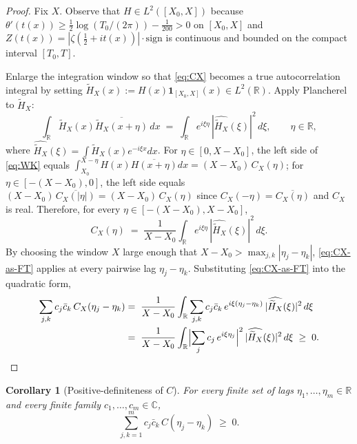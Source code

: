 \documentclass[11pt]{article}
\newtheorem{corollary}[theorem]{Corollary}
\theoremstyle{definition}
\theoremstyle{remark}
\begin{document}
\begin{proof}
Fix $X$. Observe that $H\in L^2([X_0,X])$ because $\theta'(t(x))\ge\tfrac12\log(T_0/(2\pi))-\tfrac{1}{200}>0$ on $[X_0,X]$ and $Z(t(x))=|\zeta(\tfrac12+it(x))|\cdot\mathrm{sign}$ is continuous and bounded on the compact interval $[T_0,T]$.

Enlarge the integration window so that \eqref{eq:CX} becomes a true autocorrelation integral by setting $\widetilde H_X(x):=H(x)\mathbf{1}_{[X_0,X]}(x)\in L^2(\mathbb{R})$. Apply Plancherel to $\widetilde H_X$:
\begin{equation}\label{eq:WK}
  \int_{\mathbb{R}}\widetilde H_X(x)\overline{\widetilde H_X(x+\eta)}\,dx
  \;=\;\int_{\mathbb{R}}e^{i\xi\eta}\,|\widehat{\widetilde H_X}(\xi)|^2\,d\xi,\qquad\eta\in\mathbb{R},
\end{equation}
where $\widehat{\widetilde H_X}(\xi)=\int\widetilde H_X(x)e^{-i\xi x}dx$. For $\eta\in[0,X-X_0]$, the left side of \eqref{eq:WK} equals $\int_{X_0}^{X-\eta}H(x)\overline{H(x+\eta)}dx=(X-X_0)\,C_X(\eta)$; for $\eta\in[-(X-X_0),0]$, the left side equals $(X-X_0)\,\overline{C_X(|\eta|)}=(X-X_0)\,C_X(\eta)$ since $C_X(-\eta)=\overline{C_X(\eta)}$ and $C_X$ is real. Therefore, for every $\eta\in[-(X-X_0),X-X_0]$,
\begin{equation}\label{eq:CX-as-FT}
  C_X(\eta)\;=\;\frac{1}{X-X_0}\int_{\mathbb{R}}e^{i\xi\eta}\,|\widehat{\widetilde H_X}(\xi)|^2\,d\xi.
\end{equation}
By choosing the window $X$ large enough that $X-X_0>\max_{j,k}|\eta_j-\eta_k|$, \eqref{eq:CX-as-FT} applies at every pairwise lag $\eta_j-\eta_k$. Substituting \eqref{eq:CX-as-FT} into the quadratic form,
\begin{align*}
  \sum_{j,k}c_j\bar c_k\,C_X(\eta_j-\eta_k)
  &=\;\frac{1}{X-X_0}\int_{\mathbb{R}}\sum_{j,k}c_j\bar c_k\,e^{i\xi(\eta_j-\eta_k)}\,|\widehat{\widetilde H_X}(\xi)|^2\,d\xi\\
  &=\;\frac{1}{X-X_0}\int_{\mathbb{R}}\Bigl|\sum_{j}c_j\,e^{i\xi\eta_j}\Bigr|^2\,|\widehat{\widetilde H_X}(\xi)|^2\,d\xi\;\ge\;0.
\end{align*}
\end{proof}

\begin{corollary}[Positive-definiteness of $C$]\label{cor:pdC}
For every finite set of lags $\eta_1,\dots,\eta_m\in\mathbb{R}$ and every finite family $c_1,\dots,c_m\in\mathbb{C}$,
\begin{equation}\label{eq:pdC}
  \sum_{j,k=1}^m c_j\bar c_k\,C(\eta_j-\eta_k)\;\ge\;0.
\end{equation}
\end{corollary}
\end{document}
